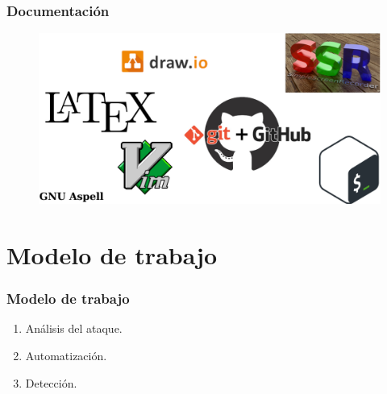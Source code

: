 \documentclass[a4paper,10pt]{beamer}
\begin{document}
\begin{frame}[fragile]
	\frametitle{Documentación}

	\begin{figure}[H]
		\centering
		\includegraphics[width=\textwidth]{figuras/TH_documentacion.png}
	\end{figure}
\end{frame}

\section{Modelo de trabajo}
\begin{frame}[fragile]
	\frametitle{Modelo de trabajo}

	\begin{enumerate}
		\item Análisis del ataque. %
		\item Automatización. %
		\item Detección. %
	\end{enumerate}
\end{frame}
\end{document}
